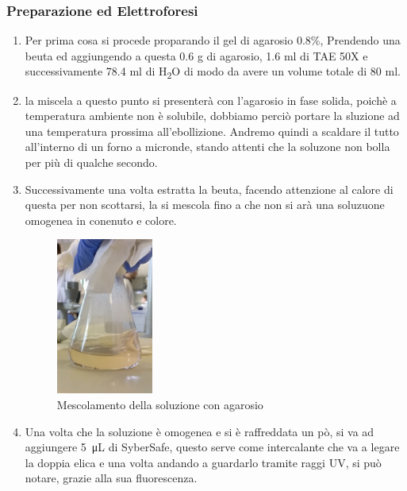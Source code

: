 \subsubsection{Preparazione ed Elettroforesi}


\begin{enumerate}

	\item Per prima cosa si procede proparando il gel di agarosio 0.8\%, Prendendo una beuta ed aggiungendo a questa 0.6 g di agarosio, 1.6 ml di TAE 50X e successivamente 78.4 ml di H\textsubscript{2}O di modo da avere un volume totale di 80 ml. 
	
	\item la miscela a questo punto si presenterà con l'agarosio in fase solida, poichè a temperatura ambiente non è solubile, dobbiamo perciò portare la sluzione ad una temperatura prossima all'ebollizione. Andremo quindi a scaldare il tutto all'interno di un forno a micronde, stando attenti che la soluzone non bolla per più di qualche secondo.
	
	\item Successivamente una volta estratta la beuta, facendo attenzione al calore di questa per non scottarsi, la si mescola fino a che non si arà una soluzuone omogenea in conenuto e colore.
	
	\begin{figure}[H]
	
		\centering
		\includegraphics[width=0.3\textwidth]{./immagini/agarosio.jpg}
		\caption{Mescolamento della soluzione con agarosio}
		\label{agarosio}
		
	\end{figure}
	
	\item Una volta che la soluzione è omogenea e si è raffreddata un pò, si va ad aggiungere \SI{5}{\micro\liter} di SyberSafe, questo serve come intercalante che va a legare la doppia elica e una volta andando a guardarlo tramite raggi UV, si può notare, grazie alla sua fluorescenza. 
	

\end{enumerate}
